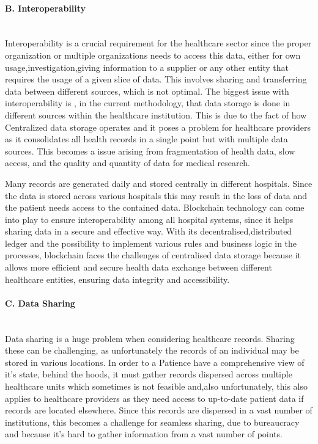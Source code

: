 \paragraph{B. Interoperability} \mbox{}\\
Interoperability is a crucial requirement for the healthcare sector since the proper organization or multiple organizations needs to access this data, either for own usage,investigation,giving information to a supplier or any other entity that requires the usage of a given slice of data. This involves sharing and transferring data between different sources, which is not optimal. The biggest issue with interoperability is , in the current methodology, that data storage is done in different sources within the healthcare institution. This is due to the fact of how Centralized data storage operates and it poses a problem for healthcare providers as it consolidates all health records in a single point but with multiple data sources. This becomes a issue arising from fragmentation of health data, slow access, and the quality and quantity of data for medical research.

Many records are generated daily and stored centrally in different hospitals. Since the data is stored across various hospitals this may result in the loss of data and the patient needs access to the contained data. Blockchain technology can come into play to ensure interoperability among all hospital systems, since it helps sharing data in a secure and effective way. With its decentralised,distributed ledger and the possibility to implement various rules and business logic in the processes, blockchain faces the challenges of centralised data storage because it allows more efficient and secure health data exchange between different healthcare entities, ensuring data integrity and accessibility. 

\paragraph{C. Data Sharing} \mbox{}\\
Data sharing is a huge problem when considering healthcare records. Sharing these can be challenging, as unfortunately the records of an individual may be stored in various locations. In order to a Patience have a comprehensive view of it's state, behind the hoods, it must gather records dispersed across multiple healthcare units which sometimes is not feasible and,also unfortunately, this also applies to healthcare providers as they need access to up-to-date patient data if records are located elsewhere. Since this records are dispersed in a vast number of institutions, this becomes a challenge for seamless sharing, due to bureaucracy and because it's hard to gather information from a vast number of points. 

